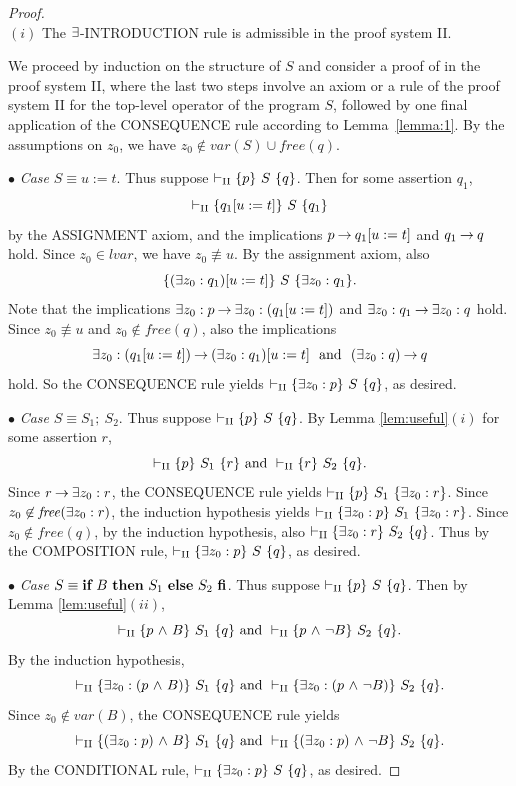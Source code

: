 \documentclass[runningheads]{llncs}       %
\begin{document}
\begin{proof}
 \mbox{} \\
 
\NI
$(i)$  The $\mbox{$\exists$}$-{\rm INTRODUCTION} rule is admissible in the proof system {\rm II}.

We proceed by induction on the structure of $S$
and consider a proof of  in the proof system \rm{II}, where 
the last two steps involve an axiom or a rule of the proof system \rm{II} for 
the top-level operator of the program $S$, 
followed by one final application of the CONSEQUENCE rule
according to Lemma~\ref{lemma:1}.
By the assumptions on $z_0$, we have $z_0 \not\in var(S) \cup \mathit{free}(q)$.

\III

\NI
$\bullet$ \emph{Case} $S \equiv u:=t$.
Thus suppose $\vdash_{\rm{II}} \mbox{$\{{p}\}\ {S}\ \{{q}\}$}$.
Then for some assertion $q_1$,
\[
 \vdash_{\rm{II}} \mbox{$\{{q_1[u:=t]}\}\ {S}\ \{{q_1}\}$}
\]
by the ASSIGNMENT axiom,
and the implications 
$p \mbox{$\:\rightarrow\:$} q_1[u:=t]$ and $q_1 \mbox{$\:\rightarrow\:$} q$ hold.
Since $z_0 \in lvar$, we have $z_0 \not \equiv u$. 
By the assignment axiom, also
\[
 \mbox{$\{{(\mbox{$\exists$} z_0:q_1)[u:=t]}\}\ {S}\ \{{\mbox{$\exists$} z_0:q_1}\}$}.
\]
Note that the implications 
$\mbox{$\exists$} z_0:p \mbox{$\:\rightarrow\:$} \mbox{$\exists$} z_0: (q_1[u:=t])$ and $\mbox{$\exists$} z_0: q_1 \mbox{$\:\rightarrow\:$} \mbox{$\exists$} z_0: q$ hold.
Since $z_0 \not \equiv u$ and $z_0 \not\in \mathit{free}(q)$, 
also the implications 
\[
 \mbox{$\exists$} z_0: (q_1[u:=t]) \mbox{$\:\rightarrow\:$} (\mbox{$\exists$} z_0:q_1)[u:=t] \ \mbox{ and }\  (\mbox{$\exists$} z_0:q) \mbox{$\:\rightarrow\:$} q
\] 
hold.
So the CONSEQUENCE rule yields
$\vdash_{\rm{II}}  \mbox{$\{{\mbox{$\exists$} z_0: p}\}\ {S}\ \{{q}\}$}$, as desired.

\III

\NI
$\bullet$ \emph{Case} $S \equiv S_1 ;\ S_2$.
Thus suppose $\vdash_{\rm{II}} \mbox{$\{{p}\}\ {S}\ \{{q}\}$}$.
By Lemma \ref{lem:useful}$(i)$
for some assertion $r$, 
\[
 \vdash_{\rm{II}} \mbox{$\{{p}\}\ {S_1}\ \{{r}\}$}  \mbox{ and }
 \vdash_{\rm{II}} \mbox{$\{{r}\}\ {S_2}\ \{{q}\}$}.
\]
Since $r \mbox{$\:\rightarrow\:$} \mbox{$\exists$} z_0:r$, the CONSEQUENCE rule yields
$\vdash_{\rm{II}}  \mbox{$\{{p}\}\ {S_1}\ \{{\mbox{$\exists$} z_0: r}\}$}$.
Since $z_0 \not \in \mathit{free}(\mbox{$\exists$} z_0: r)$, the induction hypothesis yields
$\vdash_{\rm{II}}  \mbox{$\{{\mbox{$\exists$} z_0: p}\}\ {S_1}\ \{{\mbox{$\exists$} z_0: r}\}$}$.
Since $z_0 \not\in \mathit{free}(q)$, 
by the induction hypothesis, also $\vdash_{\rm{II}}  \mbox{$\{{\mbox{$\exists$} z_0: r}\}\ {S_2}\ \{{q}\}$}$.
Thus by the COMPOSITION  rule, 
$\vdash_{\rm{II}}  \mbox{$\{{\mbox{$\exists$} z_0: p}\}\ {S}\ \{{q}\}$}$, as desired.


\III

\NI
$\bullet$ \emph{Case} $S \equiv \mbox{$\mbox{{\bf if}\ } {B} \mbox{\ {\bf then}\ } {S_1} \mbox{\ {\bf else}\ } {S_2}\ \mbox{{\bf fi}}$}$.
Thus suppose $\vdash_{\rm{II}} \mbox{$\{{p}\}\ {S}\ \{{q}\}$}$.
Then by Lemma \ref{lem:useful}$(ii)$,
\[
 \vdash_{\rm{II}} \mbox{$\{{p \mbox{$\ \wedge\ $} B}\}\ {S_1}\ \{{q}\}$} \mbox{ and }
 \vdash_{\rm{II}} \mbox{$\{{p \mbox{$\ \wedge\ $} \neg B}\}\ {S_2}\ \{{q}\}$}.
\]
By the induction hypothesis,
\[
 \vdash_{\rm{II}} \mbox{$\{{\mbox{$\exists$} z_0: (p \mbox{$\ \wedge\ $} B)}\}\ {S_1}\ \{{q}\}$}  \mbox{ and }
 \vdash_{\rm{II}} \mbox{$\{{\mbox{$\exists$} z_0: (p \mbox{$\ \wedge\ $} \neg B)}\}\ {S_2}\ \{{q}\}$}.
\]
Since $z_0 \not\in var(B)$, the CONSEQUENCE rule yields
\[
 \vdash_{\rm{II}} \mbox{$\{{(\mbox{$\exists$} z_0: p) \mbox{$\ \wedge\ $} B}\}\ {S_1}\ \{{q}\}$}  \mbox{ and }
 \vdash_{\rm{II}} \mbox{$\{{(\mbox{$\exists$} z_0: p) \mbox{$\ \wedge\ $} \neg B}\}\ {S_2}\ \{{q}\}$}.
\]
By the CONDITIONAL rule,
$\vdash_{\rm{II}} \mbox{$\{{\mbox{$\exists$} z_0: p}\}\ {S}\ \{{q}\}$}$,
as desired.


\end{proof}
\end{document}

